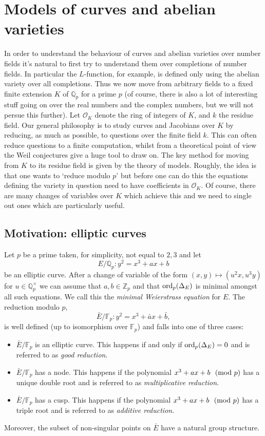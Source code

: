 \documentclass[12pt]{amsart}
\numberwithin{equation}{section}
\theoremstyle{remark}
\theoremstyle{definition}
\theoremstyle{definition}
\theoremstyle{definition}
\theoremstyle{definition}
\theoremstyle{definition}
\theoremstyle{definition}
\begin{document}
\newpage

\section{Models of curves and abelian varieties}

In order to understand the behaviour of curves and abelian varieties over number fields it's natural to first try to understand them over completions of number fields. In particular the $L$-function, for example, is defined only using the abelian variety over all completions. Thus we now move from arbitrary fields to a fixed finite extension $K$ of $\mathbb{Q}_p$ for a prime $p$ (of course, there is also a lot of interesting stuff going on over the real numbers and the complex numbers, but we will not persue this further). Let $\mathcal{O}_K$ denote the ring of integers of $K$, and $k$ the residue field. Our general philosophy is to study  curves and Jacobians over $K$ by reducing, as much as possible, to questions over the finite field $k$. This can often reduce questions to a finite computation, whilst from a theoretical point of view the Weil conjectures give a huge  tool to draw on. The key method for moving from $K$ to its residue field is given by the theory of models. Roughly, the idea is that one wants to `reduce modulo $p$' but before one can do this the equations defining the variety in question need to have coefficients in $\mathcal{O}_K$. Of course, there are many changes of variables over $K$ which achieve this and we need to single out ones which are particularly useful.

\subsection{Motivation: elliptic curves}

Let $p$ be a prime taken, for simplicity, not equal to $2,3$ and let \[E/\mathbb{Q}_p:y^2=x^3+ax+b\] be an elliptic curve. After a change of variable of the form $(x,y)\mapsto (u^2x,u^3y)$ for $u\in \mathbb{Q}_p^\times$ we can assume that $a,b\in \mathbb{Z}_p$ and that $\textup{ord}_p(\Delta_E)$ is minimal amongst all such equations. We call this the \textit{minimal Weierstrass equation} for $E$. The reduction modulo $p$, 
\[\bar{E}/\mathbb{F}_p:y^2=x^3+\bar{a}x+\bar{b},\]
is well defined (up to isomorphism over $\mathbb{F}_p$) and falls into one of three cases:
\begin{itemize}
\item $\bar{E}/\mathbb{F}_p$ is an elliptic curve. This happens if and only if $\textup{ord}_p(\Delta_E)=0$ and is referred to as \textit{good reduction}.
\item $\bar{E}/\mathbb{F}_p$ has a node. This happens if the polynomial $x^3+ax+b~~\textup{(mod }p)$ has a unique double root and is referred to as \textit{multiplicative reduction}.
\item $\bar{E}/\mathbb{F}_p$ has a cusp. This happens if the polynomial $x^3+ax+b~~\textup{(mod }p)$ has a triple root and is referred to as \textit{additive reduction}.
\end{itemize}
Moreover, the subset of non-singular points on $\bar{E}$ have a natural group structure. 
\end{document}
